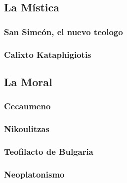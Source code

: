 \subsection{La Mística}
	\subsubsection{San Simeón, el nuevo teologo}
	
	\subsubsection{Calixto Kataphigiotis}
	
\subsection{La Moral}
	
	\subsubsection{Cecaumeno}
	\subsubsection{Nikoulitzas}
	\subsubsection{Teofilacto de Bulgaria}
	\subsubsection{Neoplatonismo}
	

